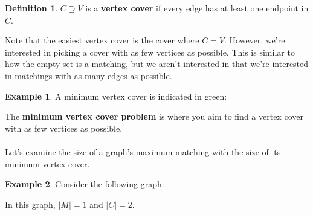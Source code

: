 \documentclass[]{article}
\theoremstyle{definition}
\newtheorem*{defn}{Definition}
\newtheorem{ex}{Example}[section]
\begin{document}
			\begin{defn}
				$C \supseteq V$ is a \textbf{vertex cover} if every edge has at least one endpoint in $C$.
			\end{defn}

			Note that the easiest vertex cover is the cover where $C = V$. However, we're interested in picking a cover with as few vertices as possible. This is similar to how the empty set is a matching, but we aren't interested in that \textendash{} we're interested in matchings with as many edges as possible.

			\begin{ex}
				A minimum vertex cover is indicated in green:
				\begin{center}
				\end{center}
			\end{ex}

			The \textbf{minimum vertex cover problem} is where you aim to find a vertex cover with as few vertices as possible.
			\\ \\
			Let's examine the size of a graph's maximum matching with the size of its minimum vertex cover.

			\begin{ex}
				Consider the following graph.
				\begin{center}
				\end{center}

				In this graph, $|M| = 1$ and $|C| = 2$.
			\end{ex}
\end{document}
